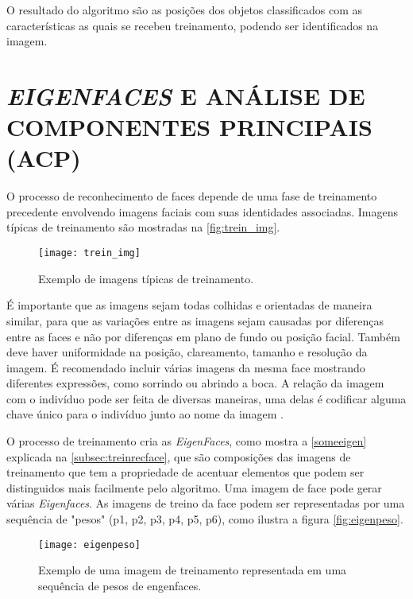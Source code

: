 O resultado do algoritmo são as posições dos objetos classificados com as características as quais se recebeu treinamento, podendo ser identificados na imagem.




\section{\textit{EIGENFACES} E ANÁLISE DE COMPONENTES PRINCIPAIS (ACP) }\label{sec:recog_faces}

O processo de reconhecimento de faces depende de uma fase de treinamento precedente envolvendo imagens faciais com suas identidades associadas. Imagens típicas de treinamento são mostradas na \autoref{fig:trein_img}.
\begin{figure}[h]
	\centering
	\texttt{[image: trein\_img]}
	\caption{Exemplo de imagens típicas de treinamento.}
	\label{fig:trein_img}
\end{figure}

É importante que as imagens sejam todas colhidas e orientadas de maneira similar, para que as variações entre as imagens sejam causadas por diferenças entre as faces e não por diferenças  em plano de fundo ou posição facial. Também deve haver uniformidade na posição, clareamento, tamanho e resolução da imagem. É recomendado incluir várias imagens da mesma face mostrando diferentes expressões, como sorrindo ou abrindo a boca. A relação da imagem com o indivíduo pode ser feita de diversas maneiras, uma delas é codificar alguma chave único para o indivíduo junto ao nome da imagem \cite{drmathew_java_programming}. 



O processo de treinamento cria as \textit{EigenFaces}, como mostra a \autoref{someeigen} explicada na  \autoref{subsec:treinrecface}, que são composições das imagens de treinamento que tem a propriedade de acentuar elementos que podem ser distinguidos mais facilmente pelo algoritmo. Uma imagem de face pode gerar várias \textit{Eigenfaces}. As imagens de treino da face podem ser representadas por uma sequência de "pesos" (p1, p2, p3, p4, p5, p6), como ilustra a figura \autoref{fig:eigenpeso}.

\begin{figure}[h]
	\centering
	\texttt{[image: eigenpeso]}
	\caption{Exemplo de uma imagem de treinamento representada em uma sequência de pesos de engenfaces.}
	\label{fig:eigenpeso}
\end{figure}

